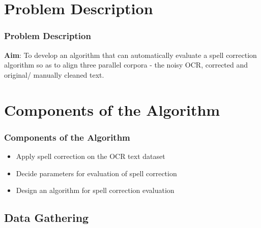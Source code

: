 \documentclass{beamer}
\begin{document}
\section{Problem Description}
\begin{frame}
\frametitle{Problem Description}
 \justifying

\textbf{Aim}: To develop an algorithm that can
automatically evaluate a spell correction algorithm so as to align three parallel corpora - the
noisy OCR, corrected and original/ manually cleaned text.



\end{frame}





 
\section{Components of the Algorithm}
\begin{frame}

\frametitle{Components of the Algorithm}
\begin{itemize}
\item
Apply spell correction on the OCR text dataset
\item
Decide parameters for evaluation of spell correction
\item
Design an algorithm for spell correction evaluation
\end{itemize}
\end{frame}

\subsection{Data Gathering}
\end{document}
